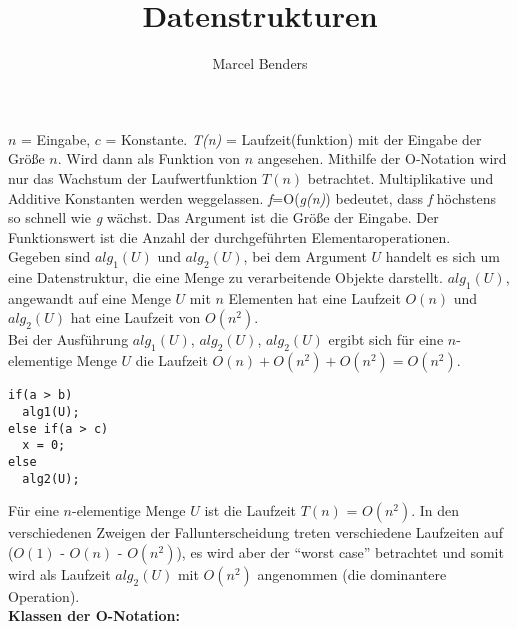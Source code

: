 \documentclass[12pt, twoside]{article}
\begin{document}
\title{Datenstrukturen}
\author{Marcel Benders}
\maketitle
\newpage

$n$ = Eingabe, $c$ = Konstante.
\textit{T(n)} = Laufzeit(funktion) mit der Eingabe der Größe $n$. Wird dann als Funktion von $n$ angesehen. Mithilfe der O-Notation wird nur das Wachstum der Laufwertfunktion $T(n)$ betrachtet. Multiplikative und Additive Konstanten werden weggelassen. \textit{f}=O(\textit{g(n)}) bedeutet, dass \textit{f} höchstens so schnell wie \textit{g} wächst. Das Argument ist die Größe der Eingabe. Der Funktionswert ist die Anzahl der durchgeführten Elementaroperationen.\\

Gegeben sind $alg_1(U)$ und $alg_2(U)$, bei dem Argument $U$ handelt es sich um eine Datenstruktur, die eine Menge zu verarbeitende Objekte darstellt.  $alg_1(U)$, angewandt auf eine Menge $U$ mit $n$ Elementen hat eine Laufzeit $O(n)$ und $alg_2(U)$ hat eine Laufzeit von $O(n^2)$.\\

Bei der Ausführung $alg_1(U)$, $alg_2(U)$, $alg_2(U)$ ergibt sich für eine $n$-elementige Menge $U$ die Laufzeit $O(n) + O(n^2) + O(n^2) = O(n^2)$.\\

\begin{lstlisting}[frame=single]
if(a > b)
  alg1(U);
else if(a > c)
  x = 0;
else
  alg2(U);
\end{lstlisting}

Für eine $n$-elementige Menge $U$ ist die Laufzeit $T(n)$ = $O(n^2)$. In den verschiedenen Zweigen der Fallunterscheidung treten verschiedene Laufzeiten auf ($O(1)$ - $O(n)$ -  $O(n^2)$), es wird aber der "`worst case"' betrachtet und somit wird als Laufzeit $alg_2(U)$ mit $O(n^2)$ angenommen (die dominantere Operation).\\

\textbf{Klassen der O-Notation:}\\
\end{document}
